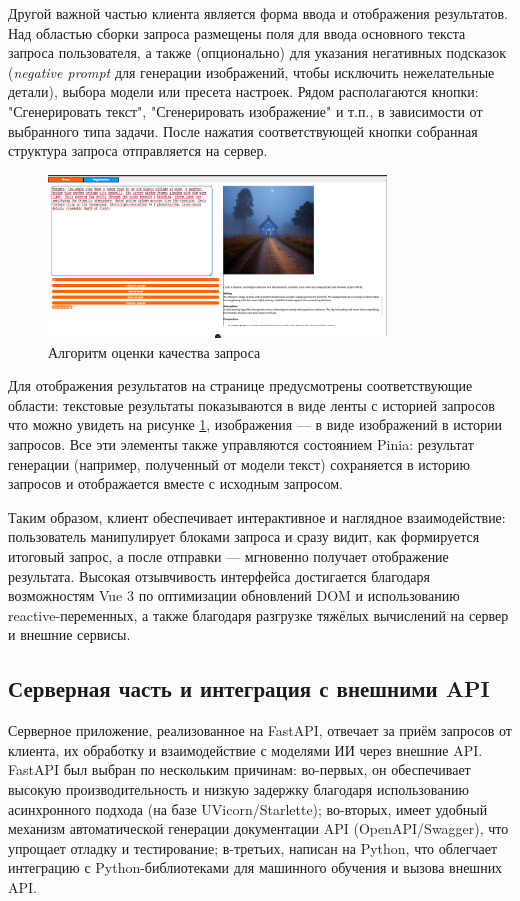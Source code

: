 Другой важной частью клиента является форма ввода и отображения результатов. Над областью сборки запроса размещены поля для ввода основного текста запроса пользователя, а также (опционально) для указания негативных подсказок (\textit{negative prompt} для генерации изображений, чтобы исключить нежелательные детали), выбора модели или пресета настроек. Рядом располагаются кнопки: "Сгенерировать текст", "Сгенерировать изображение" и т.п., в зависимости от выбранного типа задачи. После нажатия соответствующей кнопки собранная структура запроса отправляется на сервер.
\begin{figure}[htbp]
    \centering
    \includegraphics[width=0.8\textwidth]{picture/interface-screenshot_1.png}
    \caption{Алгоритм оценки качества запроса}\label{interface-screenshot}
\end{figure}
Для отображения результатов на странице предусмотрены соответствующие области: текстовые результаты показываются в виде ленты с историей запросов что можно увидеть на рисунке \ref{interface-screenshot}, изображения — в виде изображений в истории запросов. Все эти элементы также управляются состоянием Pinia: результат генерации (например, полученный от модели текст) сохраняется в историю запросов и отображается вместе с исходным запросом.

Таким образом, клиент обеспечивает интерактивное и наглядное взаимодействие: пользователь манипулирует блоками запроса и сразу видит, как формируется итоговый запрос, а после отправки — мгновенно получает отображение результата. Высокая отзывчивость интерфейса достигается благодаря возможностям Vue 3 по оптимизации обновлений DOM и использованию reactive-переменных, а также благодаря разгрузке тяжёлых вычислений на сервер и внешние сервисы.

\subsection{Серверная часть и интеграция с внешними API}

Серверное приложение, реализованное на FastAPI, отвечает за приём запросов от клиента, их обработку и взаимодействие с моделями ИИ через внешние API. FastAPI был выбран по нескольким причинам: во-первых, он обеспечивает высокую производительность и низкую задержку благодаря использованию асинхронного подхода (на базе UVicorn/Starlette); во-вторых, имеет удобный механизм автоматической генерации документации API (OpenAPI/Swagger), что упрощает отладку и тестирование; в-третьих, написан на Python, что облегчает интеграцию с Python-библиотеками для машинного обучения и вызова внешних API.

